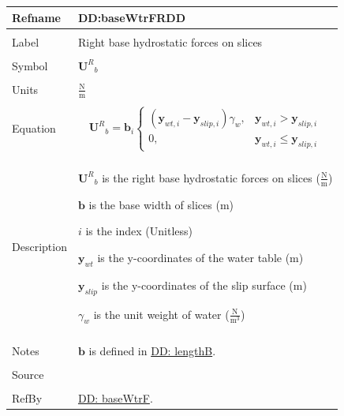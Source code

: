 \documentclass[12pt]{article}
\begin{document}
\noindent \begin{minipage}{\textwidth}
\begin{tabular}{p{} p{}}
\toprule \textbf{Refname} & \textbf{DD:baseWtrFRDD}
\label{DD:baseWtrFRDD}
\\ \midrule \\
Label & Right base hydrostatic forces on slices
\\ \midrule \\
Symbol & ${{\mathbf{U}^{R}}_{b}}$
\\ \midrule \\
Units & $\frac{\text{N}}{\text{m}}$
\\ \midrule \\
Equation & \begin{displaymath}
           {{\mathbf{U}^{R}}_{b}}={\mathbf{b}}_{i} \begin{cases}
\left({\mathbf{y}_{wt,i}}-{\mathbf{y}_{slip,i}}\right) {γ_{w}}, & {\mathbf{y}_{wt,i}}>{\mathbf{y}_{slip,i}}\\
0, & {\mathbf{y}_{wt,i}}\leq{}{\mathbf{y}_{slip,i}}
\end{cases}
           \end{displaymath}
\\ \midrule \\
Description & \begin{symbDescription}
              \item{${{\mathbf{U}^{R}}_{b}}$ is the right base hydrostatic forces on slices ($\frac{\text{N}}{\text{m}}$)}
              \item{$\mathbf{b}$ is the base width of slices (m)}
              \item{$i$ is the index (Unitless)}
              \item{${\mathbf{y}_{wt}}$ is the y-coordinates of the water table (m)}
              \item{${\mathbf{y}_{slip}}$ is the y-coordinates of the slip surface (m)}
              \item{${γ_{w}}$ is the unit weight of water ($\frac{\text{N}}{\text{m}^{3}}$)}
              \end{symbDescription}
\\ \midrule \\
Notes & $\mathbf{b}$ is defined in \hyperref[DD:lengthB]{DD: lengthB}.
\\ \midrule \\
Source & \cite{fredlund1977}
\\ \midrule \\
RefBy & \hyperref[DD:baseWtrF]{DD: baseWtrF}.
\\ \bottomrule \end{tabular}
\end{minipage}
\par~
\end{document}
